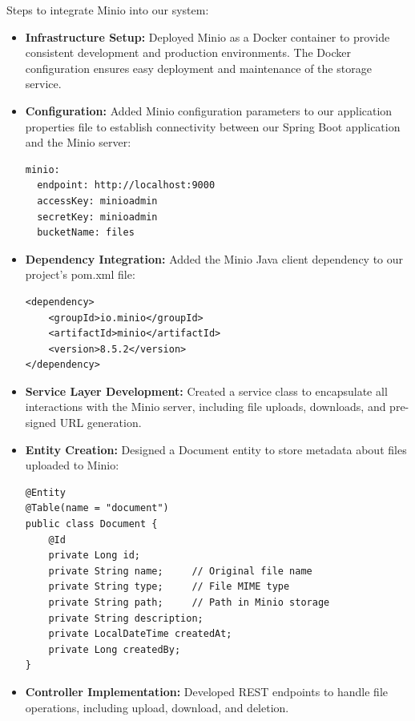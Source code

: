 Steps to integrate Minio into our system:
\begin{itemize}
    \item \textbf{Infrastructure Setup:} Deployed Minio as a Docker container to provide consistent development and production environments. The Docker configuration ensures easy deployment and maintenance of the storage service.
    
    \item \textbf{Configuration:} Added Minio configuration parameters to our application properties file to establish connectivity between our Spring Boot application and the Minio server:
    
    \begin{verbatim}
minio:
  endpoint: http://localhost:9000
  accessKey: minioadmin
  secretKey: minioadmin
  bucketName: files
    \end{verbatim}
    
    \item \textbf{Dependency Integration:} Added the Minio Java client dependency to our project's pom.xml file:
    
    \begin{verbatim}
<dependency>
    <groupId>io.minio</groupId>
    <artifactId>minio</artifactId>
    <version>8.5.2</version>
</dependency>
    \end{verbatim}
    
    \item \textbf{Service Layer Development:} Created a service class to encapsulate all interactions with the Minio server, including file uploads, downloads, and pre-signed URL generation.
    
    \item \textbf{Entity Creation:} Designed a Document entity to store metadata about files uploaded to Minio:
    
    \begin{verbatim}
@Entity
@Table(name = "document")
public class Document {
    @Id
    private Long id;
    private String name;     // Original file name
    private String type;     // File MIME type
    private String path;     // Path in Minio storage
    private String description;
    private LocalDateTime createdAt;
    private Long createdBy;
}
    \end{verbatim}
    
    \item \textbf{Controller Implementation:} Developed REST endpoints to handle file operations, including upload, download, and deletion.
    

\end{itemize}
